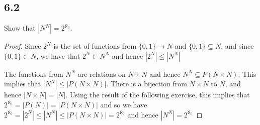 \subsection*{6.2} Show that $|N^N| = 2^{\aleph_0}$.

\begin{proof}
Since $2^N$ is the set of functions from $\{0,1\} \rightarrow N$ and $\{0,1\} \subseteq N$, and since $\{0,1\} \subset N$, we have that $2^N \subset N^N$ and hence $|2^N| \leq |N^N|$

The functions from $N^N$ are relations on $N \times N$ and hence $N^N \subseteq P(N \times N)$. This implies that $|N^N| \leq |P(N \times N)|$. There is a bijection from $N\times N$ to $N$, and hence $|N \times N| = |N|$. Using the result of the following exercise, this implies that $2^{\aleph_0} = |P(N)| = |P(N \times N)|$ and so we have $2^{\aleph_0} = |2^N| \leq |N^N| \leq |P(N \times N)| = 2^{\aleph_0}$ and hence $|N^N| = 2^{\aleph_0}$



\end{proof}

